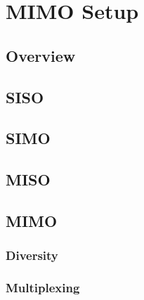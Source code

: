 \chapter{MIMO Setup}

\section*{Overview}


\section{SISO}

\section{SIMO}

\section{MISO}

\section{MIMO}

\subsection{Diversity}

\subsection{Multiplexing}